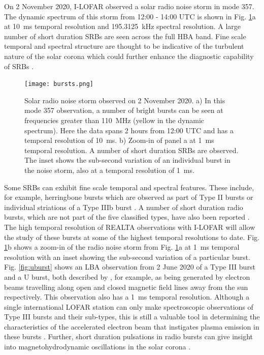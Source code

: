 On 2 November 2020, I-LOFAR observed a solar radio noise storm in mode 357. The dynamic spectrum of this storm from 12:00 - 14:00 UTC is shown in Fig. \ref{fig:357_10ms}a at 10~ms temporal resolution and \SI{195.3125}{\kilo \hertz} spectral resolution. A large number of short duration SRBs are seen across the full HBA band. Fine scale temporal and spectral structure are thought to be indicative of the turbulent nature of the solar corona which could further enhance the diagnostic capability of SRBs \citep{Kolotkov2018, Sharykin2018, Reid2021}.

\begin{figure}
    \centering
    \texttt{[image: bursts.png]}
    \caption[Solar radio noise storm observed on 2 November 2020.]{Solar radio noise storm observed on 2 November 2020. a) In this mode 357 observation, a number of bright bursts can be seen at frequencies greater than 110~MHz (yellow in the dynamic spectrum). %
    Here the data spans 2 hours from 12:00 UTC and has a temporal resolution of 10~ms.
    b) Zoom-in of panel a at 1~ms temporal resolution. A number of short duration SRBs are observed. The inset shows the sub-second variation of an individual burst in the noise storm, also at a temporal resolution of 1~ms.}
    \label{fig:357_10ms}
\end{figure}

Some SRBs can exhibit fine scale temporal and spectral features. These include, for example, herringbone bursts which are observed as part of Type II bursts \citep[for example,][]{Carley2015} or individual striations of a Type IIIb burst \citep[for example,][]{Zhang2020}. 
A number of short duration radio bursts, which are not part of the five classified types, have also been reported \citep[for example,][]{Ellis1967, Ellis1969, Melnik2010}. 
The high temporal resolution of REALTA observations with I-LOFAR will allow the study of these bursts at some of the highest temporal resolutions to date. Fig. \ref{fig:357_10ms}b shows a zoom-in of the radio noise storm from Fig. \ref{fig:357_10ms}a at 1~ms temporal resolution with an inset showing the sub-second variation of a particular burst. Fig. \ref{fig:uburst} shows an LBA observation from 2 June 2020 of a Type III burst and a U burst, both described by \cite{Reid2014}, for example, as being generated by electron beams travelling along open and closed magnetic field lines away from the sun respectively. This observation also has a 1~ms temporal resolution. Although a single international LOFAR station can only make spectroscopic observations of Type III bursts and their sub-types, this is still a valuable tool in determining the characteristics of the accelerated electron beam that instigates plasma emission in these bursts \citep{Reid2018}. Further, short duration pulsations in radio bursts can give insight into magnetohydrodynamic oscillations in the solar corona \citep{Carley2019}.

